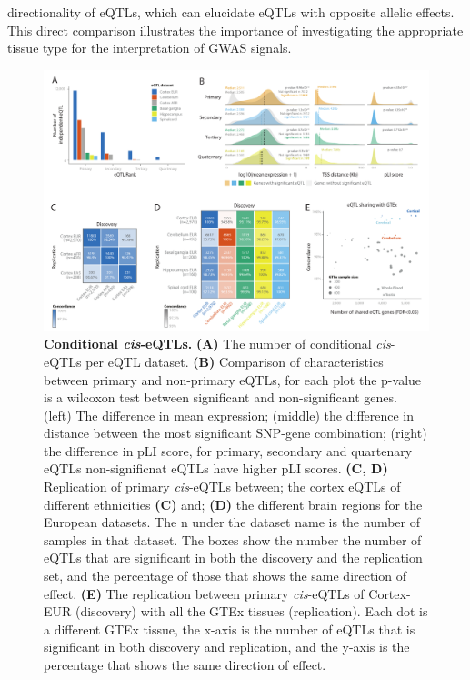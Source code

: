directionality of eQTLs, which can elucidate eQTLs with opposite allelic effects\cite{fuUnravelingRegulatoryMechanisms2012}. This direct comparison illustrates the importance of investigating the appropriate tissue type for the interpretation of GWAS signals. 

\begin{figure}[H]
	\includegraphics[width=\textwidth]{chapters/chapter5-brain-eqtls/img/2021-02-11-fig3-ciseqtls-v12.pdf}
	\caption{\textbf{Conditional \textit{cis}-eQTLs.} \textbf{(A)} The number of conditional \textit{cis}-eQTLs per eQTL dataset. \textbf{(B)} Comparison of characteristics between primary and non-primary eQTLs, for each plot the p-value is a wilcoxon test between significant and non-significant genes. (left) The difference in mean expression; (middle) the difference in distance between the most significant SNP-gene combination; (right) the difference in pLI score, for primary, secondary and quartenary eQTLs non-significnat eQTLs have higher pLI scores.  \textbf{(C, D)} Replication of primary \textit{cis}-eQTLs between; the cortex eQTLs of different ethnicities \textbf{(C)} and; \textbf{(D)} the different brain regions for the European datasets. The n under the dataset name is the number of samples in that dataset. The boxes show the number the number of eQTLs that are significant in both the discovery and the replication set, and the percentage of those that shows the same direction of effect. \textbf{(E)} The replication between primary \textit{cis}-eQTLs of Cortex-EUR (discovery) with all the GTEx tissues (replication). Each dot is a different GTEx tissue, the x-axis is the number of eQTLs that is significant in both discovery and replication, and the y-axis is the percentage that shows the same direction of effect. }
	\label{metabrain_fig3}
\end{figure}

